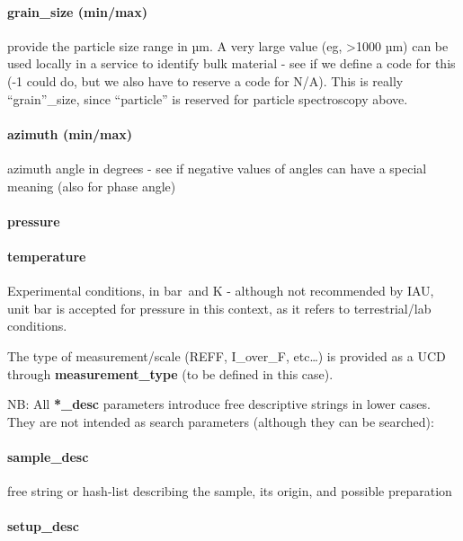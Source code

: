 \documentclass[11pt,a4paper]{ivoa}
\begin{document}
\paragraph{grain\_size (min/max)}

provide the particle size range in µm. A very large value (eg, >1000 µm) can be used locally in a service to identify bulk material - see if we define a code for this (-1 could do, but we also have to reserve a code for N/A). This is really ``grain''\_size, since ``particle'' is reserved for particle spectroscopy above.\\

\paragraph{azimuth (min/max)}

azimuth angle in degrees - see if negative values of angles can have a special meaning (also for phase angle)

\paragraph{pressure}

\paragraph{temperature}

Experimental conditions, in bar and K - although not recommended by IAU, unit bar is accepted for pressure in this context, as it refers to terrestrial/lab conditions.

The type of measurement/scale (REFF, I\_over\_F, etc…) is provided as a UCD through \textbf{measurement\_type} (to be defined in this case).

NB: All \textbf{*\_desc} parameters introduce free descriptive strings in lower cases. They are not intended as search parameters (although they can be searched):

\paragraph{sample\_desc}

free string or hash-list describing the sample, its origin, and possible preparation

\paragraph{setup\_desc}
\end{document}
